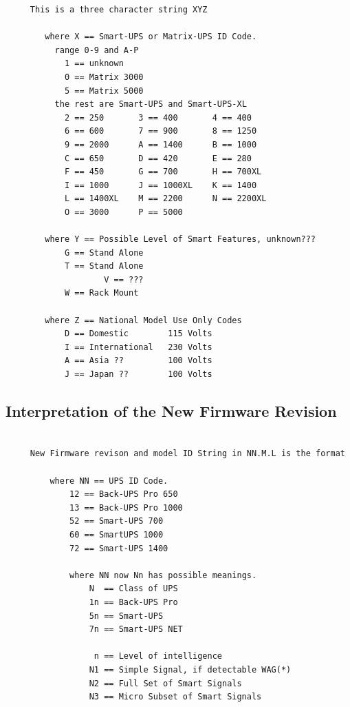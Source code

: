{{{{{{{{{{{{{{{{{\begin{verbatim}
     This is a three character string XYZ
     
        where X == Smart-UPS or Matrix-UPS ID Code.
          range 0-9 and A-P
            1 == unknown
            0 == Matrix 3000
            5 == Matrix 5000
          the rest are Smart-UPS and Smart-UPS-XL
            2 == 250       3 == 400       4 == 400
            6 == 600       7 == 900       8 == 1250
            9 == 2000      A == 1400      B == 1000
            C == 650       D == 420       E == 280
            F == 450       G == 700       H == 700XL
            I == 1000      J == 1000XL    K == 1400
            L == 1400XL    M == 2200      N == 2200XL
            O == 3000      P == 5000
     
        where Y == Possible Level of Smart Features, unknown???
            G == Stand Alone
            T == Stand Alone
                    V == ???
            W == Rack Mount
     
        where Z == National Model Use Only Codes
            D == Domestic        115 Volts
            I == International   230 Volts
            A == Asia ??         100 Volts
            J == Japan ??        100 Volts
\end{verbatim}
\normalsize

\label{Interpretation-of-the-New-Firmware-Revision}

\subsection*{Interpretation of the New Firmware Revision}

\footnotesize
\begin{verbatim}
     
     New Firmware revison and model ID String in NN.M.L is the format
     
         where NN == UPS ID Code.
             12 == Back-UPS Pro 650
             13 == Back-UPS Pro 1000
             52 == Smart-UPS 700
             60 == SmartUPS 1000
             72 == Smart-UPS 1400
     
             where NN now Nn has possible meanings.
                 N  == Class of UPS
                 1n == Back-UPS Pro
                 5n == Smart-UPS
                 7n == Smart-UPS NET
     
                  n == Level of intelligence
                 N1 == Simple Signal, if detectable WAG(*)
                 N2 == Full Set of Smart Signals
                 N3 == Micro Subset of Smart Signals
     

\end{verbatim}}}}}}}}}}}}}}}}}}
